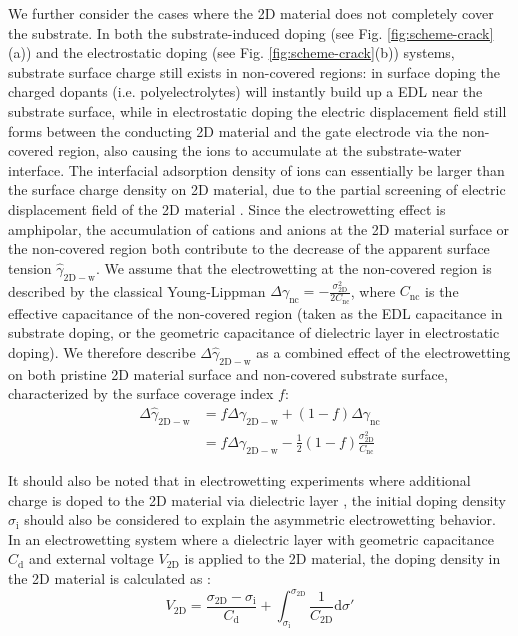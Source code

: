 \documentclass[journal=ancac3,manuscript=article,email=true]{achemso}
\begin{document}
We further consider the cases where the 2D material does not
completely cover the substrate. In both the substrate-induced doping
(see Fig. \ref{fig:scheme-crack}(a)) and the electrostatic doping (see
Fig. \ref{fig:scheme-crack}(b)) systems, substrate surface charge still
exists in non-covered regions: in surface doping the charged dopants
(i.e. polyelectrolytes) will instantly build up a EDL near the
substrate surface, while in electrostatic doping the electric
displacement field still forms between the conducting 2D material and
the gate electrode via the non-covered region, also causing the ions
to accumulate at the substrate-water interface. The interfacial
adsorption density of ions can essentially be larger than the surface
charge density on 2D material, due to the partial screening of
electric displacement field of the 2D material
\cite{tian_multiscale_2016,Shih2015PartiallyScreened,Muruganathan_2015,Huttmann_2015}. Since
the electrowetting effect is amphipolar, the accumulation of cations
and anions at the 2D material surface or the non-covered region
both contribute to the decrease of the apparent surface tension
\(\hat{\gamma}_{\mathrm{2D-w}}\). We assume that the electrowetting at
the non-covered region is described by the classical Young-Lippman
\(\Delta
\gamma_{\mathrm{nc}}=-\frac{\sigma_{\mathrm{2D}}^{2}}{2C_{\mathrm{nc}}}\),
where \(C_{\mathrm{nc}}\) is the effective capacitance of the
non-covered region (taken as the EDL capacitance in substrate doping,
or the geometric capacitance of dielectric layer in electrostatic
doping). We therefore describe \(\Delta
\hat{\gamma}_{\mathrm{2D-w}}\) as a combined effect of the
electrowetting on both pristine 2D material surface and non-covered substrate surface,
characterized by the surface coverage index \(f\):
\begin{equation}
\label{eqn:apparent-gamma-combined}
\begin{aligned}
\Delta \hat{\gamma}_{\mathrm{2D-w}} &= f \Delta \gamma_{\mathrm{2D-w}} + (1-f)\Delta \gamma_{\mathrm{nc}} \\
&= f \Delta \gamma_{\mathrm{2D-w}}  -\frac{1}{2}(1-f)\frac{\sigma_{\mathrm{2D}}^{2}}{C_{\mathrm{nc}}}
\end{aligned}
\end{equation}

It should also be noted that in electrowetting experiments
where additional charge is doped to the 2D material via dielectric
layer \cite{hong_mechanism_2016}, the initial doping density
\(\sigma_{\mathrm{i}}\) should also be considered to explain the
asymmetric electrowetting behavior. In an electrowetting system where a
dielectric layer with geometric capacitance \(C_{\mathrm{d}}\) and external
voltage \(V_{\mathrm{2D}}\) is applied to the 2D material, the doping
density in the 2D material is calculated as \cite{tian_multiscale_2016}:
\begin{equation}
\label{eqn:doping-vm-2D}
V_{\mathrm{2D}} = \frac{\sigma_{\mathrm{2D}} - \sigma_{\mathrm{i}}} {C_{\mathrm{d}}} 
                 + \int_{\sigma_{\mathrm{i}}}^{\sigma_{\mathrm{2D}}} 
                   \frac{1}{C_{\mathrm{2D}}} \mathrm{d}\sigma'
\end{equation}
\end{document}
